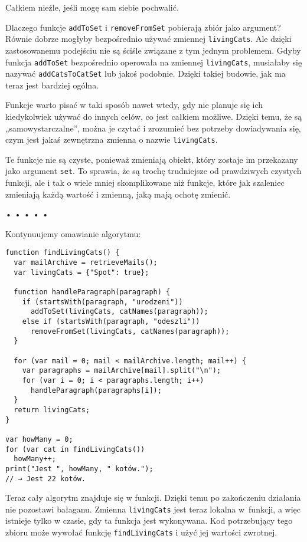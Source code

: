 Całkiem nieźle, jeśli mogę sam siebie pochwalić.

    
Dlaczego funkcje \texttt{addToSet} i \texttt{removeFromSet} pobierają zbiór jako argument? Równie dobrze mogłyby bezpośrednio używać zmiennej \texttt{livingCats}. Ale dzięki zastosowanemu podejściu nie są ściśle związane z tym jednym problemem. Gdyby funkcja \texttt{addToSet} bezpośrednio operowała na zmiennej \texttt{livingCats}, musiałaby się nazywać \texttt{addCatsToCatSet} lub jakoś podobnie. Dzięki takiej budowie, jak ma teraz jest bardziej ogólna.

    
Funkcje warto pisać w taki sposób nawet wtedy, gdy nie planuje się ich kiedykolwiek używać do innych celów, co jest całkiem możliwe. Dzięki temu, że są „samowystarczalne”, można je czytać i zrozumieć bez potrzeby dowiadywania się, czym jest jakaś zewnętrzna zmienna o nazwie \texttt{livingCats}.

    
Te funkcje nie są czyste, ponieważ zmieniają obiekt, który zostaje im przekazany jako argument \texttt{set}. To sprawia, że są trochę trudniejsze od prawdziwych czystych funkcji, ale i tak o wiele mniej skomplikowane niż funkcje, które jak szaleniec zmieniają każdą wartość i zmienną, jaką mają ochotę zmienić.

  
  
\begin{center}
• • • • •
\end{center}
  
    
Kontynuujemy omawianie algorytmu:

    
\begin{verbatim} 
function findLivingCats() {
  var mailArchive = retrieveMails();
  var livingCats = {"Spot": true};

  function handleParagraph(paragraph) {
    if (startsWith(paragraph, "urodzeni"))
      addToSet(livingCats, catNames(paragraph));
    else if (startsWith(paragraph, "odeszli"))
      removeFromSet(livingCats, catNames(paragraph));
  }

  for (var mail = 0; mail < mailArchive.length; mail++) {
    var paragraphs = mailArchive[mail].split("\n");
    for (var i = 0; i < paragraphs.length; i++)
      handleParagraph(paragraphs[i]);
  }
  return livingCats;
}

var howMany = 0;
for (var cat in findLivingCats())
  howMany++;
print("Jest ", howMany, " kotów.");
// → Jest 22 kotów.
\end{verbatim}
    
Teraz cały algorytm znajduje się w funkcji. Dzięki temu po zakończeniu działania nie pozostawi bałaganu. Zmienna \texttt{livingCats} jest teraz lokalna w~funkcji, a więc istnieje tylko w czasie, gdy ta funkcja jest wykonywana. Kod potrzebujący tego zbioru może wywołać funkcję \texttt{findLivingCats} i użyć jej wartości zwrotnej.

